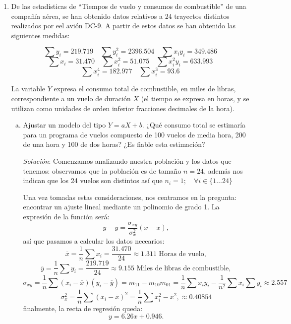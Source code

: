 \documentclass[10pt,a4paper]{article}
\begin{document}
\begin{enumerate}
        \item De las estadísticas de ``Tiempos de vuelo y consumos de combustible'' de una compañía aérea, se han obtenido datos relativos a 24 trayectos distintos realizados por eel avión DC-9. A partir de estos datos se han obtenido las siguientes medidas:
            \begin{center}
                \[
                \sum y_i = 219.719 \quad  \sum y_i^2 = 2396.504 \quad \sum x_i y_i = 349.486
                \]
                \[
                \sum x_i = 31.470 \quad \sum x_i^2 = 51.075 \quad \sum x_i^2 y_i = 633.993
                \]
                \[
                \sum x_i^4 = 182.977 \quad \sum x_i^3 = 93.6
                \]
            \end{center}
            La variable \(Y\) expresa el consumo total de combustible, en miles de libras, correspondiente a un vuelo de duración \(X\) (el tiempo se expresa en horas, y se utilizan como unidades de orden inferior fracciones decimales de la hora).

            \begin{enumerate}[a)]
                \item Ajustar un modelo del tipo \(Y=aX+b\). ¿Qué consumo total se estimaría para un programa de vuelos compuesto de 100 vuelos de media hora, 200 de una hora y 100 de dos horas? ¿Es fiable esta estimación?


                    \emph{Solución}: Comenzamos analizando nuestra población y los datos que tenemos: observamos que la población es de tamaño \(n=24\), además nos indican que los 24 vuelos son distintos así que \(n_i = 1; \quad \forall i \in \{1 \dots 24\}\) 


                    Una vez tomadas estas consideraciones, nos centramos en la pregunta: encontrar un ajuste lineal mediante un polinomio de grado 1. La expresión de la función será: \[y - \overline{y}=\frac{\sigma_{xy}}{\sigma_x^2}\left(x-\overline{x}\right),\] así que pasamos a calcular los datos necearios:\[\overline{x}=\frac{1}{n}\sum x_i = \frac{31.470}{24}\approx1.311\text{ Horas de vuelo},\]\[\overline{y}=\frac{1}{n}\sum y_i=\frac{219.719}{24}\approx 9.155\text{ Miles de libras de combustible},\]\[\sigma_{xy}=\frac{1}{n}\sum(x_i-\overline{x})(y_i-\overline{y})=m_{11}-m_{10}m_{01}=\frac{1}{n}\sum x_iy_i-\frac{1}{n^2}\sum x_i\sum y_i\approx 2.557\]\[\sigma_x^2=\frac{1}{n}\sum(x_i-\overline{x})^2=\frac{1}{n}\sum x_i^2 - \overline{x}^2,\approx 0.40854\] finalmente, la recta de regresión queda: \[y=6.26x+0.946.\]


\end{enumerate}
\end{enumerate}
\end{document}
